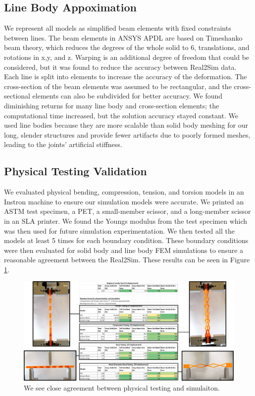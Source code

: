 \documentclass[11pt, a4paper]{article}
\begin{document}
\subsection{Line Body Appoximation}
We represent all models as simplified beam elements with fixed constraints between lines. The beam elements in ANSYS APDL are based on Timeshanko beam theory, which reduces the degrees of the whole solid to 6, translations, and rotations in x,y, and z. Warping is an additional degree of freedom that could be considered, but it was found to reduce the accuracy between Real2Sim data. Each line is split into elements to increase the accuracy of the deformation. The cross-section of the beam elements was assumed to be rectangular, and the cross-sectional elements can also be subdivided for better accuracy. We found diminishing returns for many line body and cross-section elements; the computational time increased, but the solution accuracy stayed constant. We used line bodies because they are more scalable than solid body meshing for our long, slender structures and provide fewer artifacts due to poorly formed meshes, leading to the joints' artificial stiffness. 

\subsection{Physical Testing Validation}
We evaluated physical bending, compression, tension, and torsion models in an Instron machine to ensure our simulation models were accurate. We printed an ASTM test specimen, a PET, a small-member scissor, and a long-member scissor in an SLA printer. We found the Youngs modulus from the test specimen which was then used for future simulation experimentation. We then tested all the models at least 5 times for each boundary condition. These boundary conditions were then evaluated for solid body and line body FEM simulations to ensure a reasonable agreement between the Real2Sim. These results can be seen in Figure \ref{fig:physical validation}.

\begin{figure}
\centering
\includegraphics[width=\linewidth]{figures-sup/sim_validation.png}

\centering
\caption{We see close agreement between physical testing and simulaiton.}
\label{fig:physical validation}
\end{figure}
\end{document}
